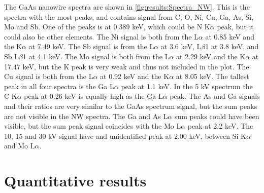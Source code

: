 The GaAs nanowire spectra are shown in \cref{fig:results:Spectra_NW}.
This is the spectra with the most peaks, and contains signal from C, O, Ni, Cu, Ga, As, Si, Mo and Sb.
One of the peaks is at 0.389 keV, which could be N K$\alpha$ peak, but it could also be other elements. %
The Ni signal is both from the L$\alpha$ at 0.85 keV and the K$\alpha$ at 7.49 keV.
The Sb signal is from the L$\alpha$ at 3.6 keV, L$\beta$1 at 3.8 keV, and Sb L$\beta$1 at 4.1 keV. %
The Mo signal is both from the L$\alpha$ at 2.29 keV and the K$\alpha$ at 17.47 keV, but the K peak is very weak and thus not included in the plot.
The Cu signal is both from the L$\alpha$ at 0.92 keV and the K$\alpha$ at 8.05 keV.
The tallest peak in all four spectra is the Ga L$\alpha$ peak at 1.1 keV.
In the 5 kV spectrum the C K$\alpha$ peak at 0.26 keV is equally high as the Ga L$\alpha$ peak.
The As and Ga signals and their ratios are very similar to the GaAs spectrum signal, but the sum peaks are not visible in the NW spectra.
The Ga and As L$\alpha$ sum peaks could have been visible, but the sum peak signal coincides with the Mo L$\alpha$ peak at 2.2 keV. %
The 10, 15 and 30 kV signal have and unidentified peak at 2.00 keV, between Si K$\alpha$ and Mo L$\alpha$. %






























\section{Quantitative results}
\label{sec:results:quantification}




